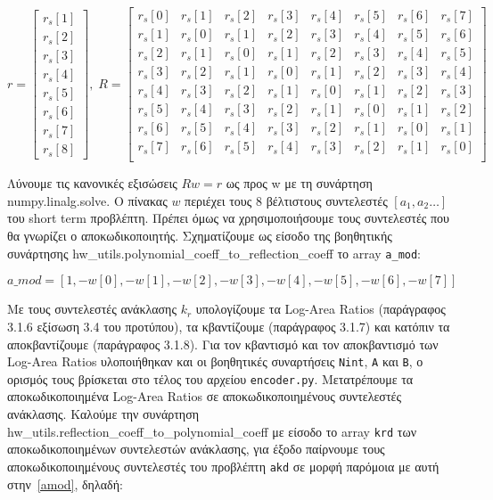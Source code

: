 \documentclass{article}
\begin{document}
\begin{equation}
    r = \left[\begin{matrix}
        r_s[1] \\
        r_s[2] \\
        r_s[3] \\
        r_s[4] \\
        r_s[5] \\
        r_s[6] \\
        r_s[7] \\
        r_s[8]
    \end{matrix}\right],\;
    R = \left[\begin{matrix}
        r_s[0] & r_s[1] & r_s[2] & r_s[3] & r_s[4] & r_s[5] & r_s[6] & r_s[7] \\
        r_s[1] & r_s[0] & r_s[1] & r_s[2] & r_s[3] & r_s[4] & r_s[5] & r_s[6] \\
        r_s[2] & r_s[1] & r_s[0] & r_s[1] & r_s[2] & r_s[3] & r_s[4] & r_s[5] \\
        r_s[3] & r_s[2] & r_s[1] & r_s[0] & r_s[1] & r_s[2] & r_s[3] & r_s[4] \\
        r_s[4] & r_s[3] & r_s[2] & r_s[1] & r_s[0] & r_s[1] & r_s[2] & r_s[3] \\ 
        r_s[5] & r_s[4] & r_s[3] & r_s[2] & r_s[1] & r_s[0] & r_s[1] & r_s[2] \\ 
        r_s[6] & r_s[5] & r_s[4] & r_s[3] & r_s[2] & r_s[1] & r_s[0] & r_s[1] \\
        r_s[7] & r_s[6] & r_s[5] & r_s[4] & r_s[3] & r_s[2] & r_s[1] & r_s[0] \\
    \end{matrix}\right]
\end{equation}

Λύνουμε τις κανονικές εξισώσεις $Rw=r$ ως προς w με τη συνάρτηση 
numpy.linalg.solve. Ο πίνακας $w$ περιέχει τους 8 βέλτιστους 
συντελεστές $\left[a_1, a_2 \ldots \right]$ του short term προβλέπτη. Πρέπει όμως να 
χρησιμοποιήσουμε τους συντελεστές που θα γνωρίζει ο αποκωδικοποιητής. Σχηματίζουμε 
ως είσοδο της βοηθητικής συνάρτησης hw\_utils.polynomial\_coeff\_to\_reflection\_coeff
το array \verb|a_mod|:

\begin{equation}
    a\_mod = \left[1, -w[0], -w[1], -w[2], -w[3], -w[4], -w[5], -w[6], -w[7] \right]\label{amod}
\end{equation}

Με τους συντελεστές ανάκλασης $k_r$ υπολογίζουμε τα Log-Area Ratios 
(παράγραφος 3.1.6 εξίσωση 3.4 του προτύπου), τα κβαντίζουμε (παράγραφος 3.1.7) 
και κατόπιν τα αποκβαντίζουμε (παράγραφος 3.1.8). Για τον κβαντισμό και τον 
αποκβαντισμό των Log-Area Ratios υλοποιήθηκαν και οι βοηθητικές συναρτήσεις
\verb|Nint|, \verb|A| και \verb|B|, ο ορισμός τους βρίσκεται στο τέλος του
αρχείου \verb|encoder.py|. Μετατρέπουμε τα αποκωδικοποιημένα Log-Area Ratios
σε αποκωδικοποιημένους συντελεστές ανάκλασης. Καλούμε την συνάρτηση 
hw\_ut\-ils.ref\-lection\_co\-eff\_to\_poly\-nomial\_co\-eff με είσοδο
το array \verb|krd| των αποκωδικοποιημένων συντελεστών ανάκλασης, για έξοδο 
παίρνουμε τους αποκωδικοποιημένους συντελεστές του προβλέπτη \verb|akd| σε μορφή παρόμοια
με αυτή στην~\autoref{amod}, δηλαδή:
\end{document}
